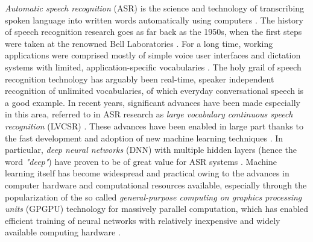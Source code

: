 \documentclass[english, 12pt, a4paper, pdftex, elec, utf8]{aaltothesis}
\begin{document}
\textit{Automatic speech recognition} (ASR) is the science and technology of transcribing spoken language into written words automatically using computers \cite{yu2014automatic, huang2001spoken}. The history of speech recognition research goes as far back as the 1950s, when the first steps were taken at the renowned Bell Laboratories \cite{gales2008application}. For a long time, working applications were comprised mostly of simple voice user interfaces and dictation systems with limited, application-specific vocabularies \cite{yu2014automatic, gales2008application}. The holy grail of speech recognition technology has arguably been real-time, speaker independent recognition of unlimited vocabularies, of which everyday conversational speech is a good example. In recent years, significant advances have been made especially in this area, referred to in ASR research as \textit{large vocabulary continuous speech recognition} (LVCSR) \cite{yu2014automatic, keronen2014approaching}. These advances have been enabled in large part thanks to the fast development and adoption of new machine learning techniques \cite{yu2014automatic, hinton2012deep}. In particular, \textit{deep neural networks} (DNN) with multiple hidden layers (hence the word \textit{"deep"}) have proven to be of great value for ASR systems \cite{yu2014automatic, hinton2012deep}. Machine learning itself has become widespread and practical owing to the advances in computer hardware and computational resources available, especially through the popularization of the so called \textit{general-purpose computing on graphics processing units} (GPGPU) technology for massively parallel computation, which has enabled efficient training of neural networks with relatively inexpensive and widely available computing hardware \cite{yu2014automatic, hinton2012deep}. \\\\
\end{document}
